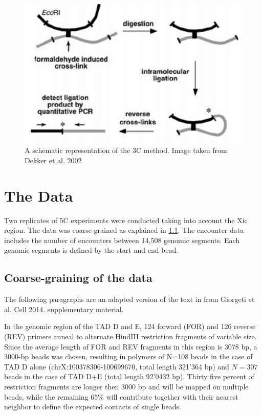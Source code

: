 \documentclass[12pt]{paper}
\begin{document}
\begin{figure}[H]\label{3Cschematic}
\includegraphics[scale = 0.4]{3Cschematic}
\caption{\scriptsize{A schematic representation of the 3C method. Image taken from \href{http://www.sciencemag.org/content/295/5558/1306.full.pdf}{Dekker et al.} 2002}}
\end{figure}

\section{The Data}
Two replicates of 5C experiments were conducted taking into account the Xic region. The data was coarse-grained as explained in \ref{coarseGrainingOfEncounterData}.
The encounter data includes the number of encounters between 14,508 genomic segments. Each genomic segments is defined by the start and end bead.

\subsection{Coarse-graining of the data}\label{coarseGrainingOfEncounterData}
The following paragraphs are an adapted version of the text in from Giorgeti et al. Cell 2014. supplementary material.

In the genomic region of the TAD D and E, 124 forward (FOR) and 126 reverse (REV) primers anneal to alternate HindIII restriction fragments of variable size. 
Since the average length of FOR and REV fragments in this region is 3078 bp, a 3000-bp beads was chosen, resulting in polymers of N=108 beads in the case of TAD D alone (chrX:100378306-100699670, total length 321’364 bp) and $N=307$ beads in the case of TAD D+E (total length 92’0432 bp). Thirty five percent of restriction fragments are longer then 3000 bp and will be mapped on multiple beads, while the remaining $65\%$ will contribute together with their nearest neighbor to define the expected contacts of single beads.
\end{document}
